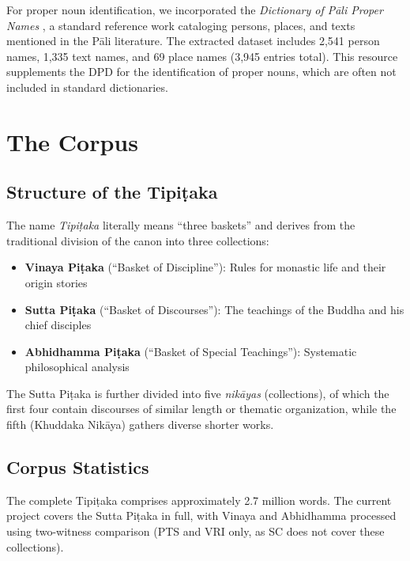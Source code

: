 \documentclass[unnumsec,webpdf,contemporary,large]{oup-authoring-template}
\begin{document}
For proper noun identification, we incorporated the \emph{Dictionary of Pāli Proper Names} \citep{malalasekera1937}, a standard reference work cataloging persons, places, and texts mentioned in the Pāli literature. The extracted dataset includes 2,541 person names, 1,335 text names, and 69 place names (3,945 entries total). This resource supplements the DPD for the identification of proper nouns, which are often not included in standard dictionaries.

\section{The Corpus}

\subsection{Structure of the Tipiṭaka}

The name \emph{Tipiṭaka} literally means ``three baskets'' and derives from the traditional division of the canon into three collections:

\begin{itemize}
\item \textbf{Vinaya Piṭaka} (``Basket of Discipline''): Rules for monastic life and their origin stories
\item \textbf{Sutta Piṭaka} (``Basket of Discourses''): The teachings of the Buddha and his chief disciples
\item \textbf{Abhidhamma Piṭaka} (``Basket of Special Teachings''): Systematic philosophical analysis
\end{itemize}

The Sutta Piṭaka is further divided into five \emph{nikāyas} (collections), of which the first four contain discourses of similar length or thematic organization, while the fifth (Khuddaka Nikāya) gathers diverse shorter works.

\subsection{Corpus Statistics}

The complete Tipiṭaka comprises approximately 2.7 million words. The current project covers the Sutta Piṭaka in full, with Vinaya and Abhidhamma processed using two-witness comparison (PTS and VRI only, as SC does not cover these collections).
\end{document}
